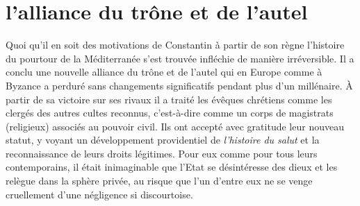 \section{l'alliance du trône et de l'autel}


Quoi qu'il en soit des motivations de Constantin à partir de son règne l'histoire du pourtour de la Méditerranée s'est trouvée infléchie de manière irréversible. Il a conclu une nouvelle alliance du trône et de l'autel qui en Europe comme à Byzance a perduré sans changements significatifs pendant plus d'un millénaire. À partir de sa victoire sur ses rivaux il a traité les évêques chrétiens comme les clergés des autres cultes reconnus, c'est-à-dire comme un corps de magistrats (religieux) associés au pouvoir civil. Ils ont accepté avec gratitude leur nouveau statut, y voyant un développement providentiel de \emph{l'histoire du salut} et la reconnaissance de leurs droits légitimes. Pour eux comme pour tous leurs contemporains, il était inimaginable que l'Etat se désintéresse des dieux et les relègue dans la sphère privée, au risque que l'un d'entre eux ne se venge cruellement d'une négligence si discourtoise. 
 
